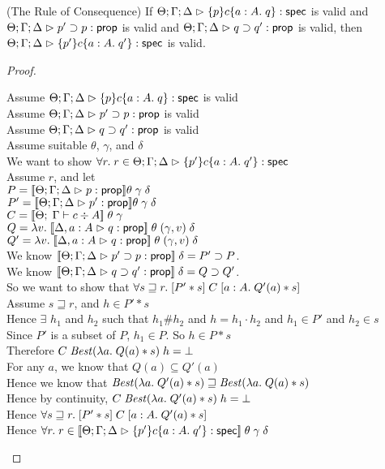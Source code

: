 \begin{lemma}{(The Rule of Consequence)}
If $\judgeS{\spec{p}{c}{a:A}{q}}$ is valid and $\judgeA{p' \implies p}{\assert}$ is valid
and $\judgeA{q \implies q'}{\assert}$ is valid, then $\judgeS{\spec{p'}{c}{a:A}{q'}}$ is valid.
\end{lemma}
\begin{proof}
\begin{tabbedproof}
\oo Assume $\judgeS{\spec{p}{c}{a:A}{q}}$ is valid \\
\oo Assume $\judgeA{p' \implies p}{\assert}$ is valid \\
\oo Assume $\judgeA{q \implies q'}{\assert}$ is valid \\
\oo Assume suitable $\theta$, $\gamma$, and $\delta$ \\
\ooo We want to show $\forall r.\; r \in \judgeS{\spec{p'}{c}{a:A}{q'}}$ \\
\ooo Assume $r$, and let \\
\ooox $P = \interp{\judgeA{p}{\assert}}\theta\;\gamma\;\delta$ \\
\ooox $P' = \interp{\judgeA{p'}{\assert}}\theta\;\gamma\;\delta$ \\
\ooox $C = \interp{\judgeC{\Gamma}{c}{A}}\;\theta\;\gamma$ \\
\ooox $Q = \semfun{v}{\interp{\judgeA[\Delta,a:A]{q}{\assert}}\;\theta\;(\gamma, v)\;\delta}$ \\
\ooox $Q' = \semfun{v}{\interp{\judgeA[\Delta,a:A]{q}{\assert}}\;\theta\;(\gamma, v)\;\delta}$ \\
\ooo We know $\interp{\judgeA{p' \implies p}{\assert}}\;\delta = P' \implies P$. \\
\ooo We know $\interp{\judgeA{q \implies q'}{\assert}}\;\delta = Q \implies Q'$. \\
\ooo So we want to show that $\forall s \sqsupseteq r.\; \basicspec{P' * s}{C}{a:A}{Q'(a) * s}$ \\
\ooo Assume $s \sqsupseteq r$, and $h \in P' * s$ \\
\oooo Hence $\exists$ $h_1$ and $h_2$ such that $h_1 \# h_2$ and $h = h_1 \cdot h_2$ 
     and $h_1 \in P'$ and $h_2 \in s$ \\
\oooo Since $P'$ is a subset of $P$, $h_1 \in P$. So $h \in P * s$ \\
\oooo Therefore $C\;\mathit{Best}(\semfun{a}{Q(a) * s})\;h = \bot$ \\
\oooo For any $a$, we know that $Q(a) \subseteq Q'(a)$ \\
\oooo Hence  we know that $\mathit{Best}(\semfun{a}{Q'(a) * s}) \sqsupseteq \mathit{Best}(\semfun{a}{Q(a) * s})$ \\
\oooo Hence by continuity, $C\;\mathit{Best}(\semfun{a}{Q'(a) * s})\;h = \bot$ \\
\ooo Hence $\forall s \sqsupseteq r.\; \basicspec{P' * s}{C}{a:A}{Q'(a) * s}$ \\
\ooo Hence $\forall r.\; r \in \interp{\judgeS{\spec{p'}{c}{a:A}{q'}}}\;\theta\;\gamma\;\delta$ \\



\end{tabbedproof}
\end{proof}


